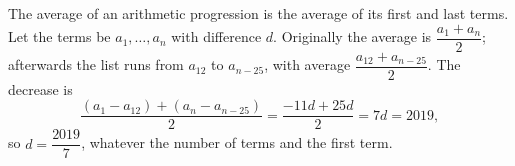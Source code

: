 The average of an arithmetic progression is the average of its first and last terms. Let the terms be $a_1,\dots,a_n$ with difference $d$. Originally the average is $\dfrac{a_1+a_n}{2}$; afterwards the list runs from $a_{12}$ to $a_{n-25}$, with average $\dfrac{a_{12}+a_{n-25}}{2}$. The decrease is
\[\dfrac{(a_1-a_{12})+(a_n-a_{n-25})}{2}=\dfrac{-11d+25d}{2}=7d=2019,\]
so $d=\boxed{\dfrac{2019}{7}}$, whatever the number of terms and the first term.
